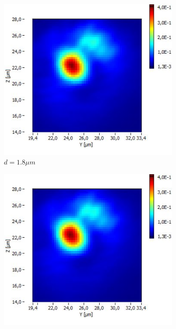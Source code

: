 \documentclass[a4paper,11pt]{article}
\begin{document}
\begin{figure}[htb]
  \begin{subfigure}[b]{.20\linewidth}
    \centering
    \includegraphics[width=\textwidth]{Fibre5/scan_021_g1.jpg}
    \caption{$d=1.8\mu m$}
  \end{subfigure}
  \begin{subfigure}[b]{.20\linewidth}
    \centering
    \includegraphics[width=\textwidth]{Fibre5/scan_022_g1.jpg}

\end{subfigure}
\end{figure}
\end{document}
